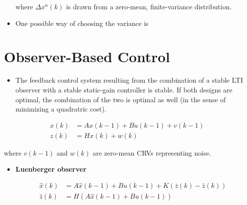 \documentclass[10pt,a4paper]{scrartcl}
\begin{document}
\begin{multicols*}{2}
\begin{multicols*}{3}
\begin{itemize}

where $\Delta x^n(k)$ is drawn from a zero-mean, finite-variance distribution.
\item One possible way of choosing the variance is 


\end{itemize}

\section{Observer-Based Control}


\begin{itemize}
\item The feedback control system resulting from the combination of a stable LTI observer with a stable static-gain controller is stable. If both designs are optimal, the combination of the two is optimal as well (in the sense of minimizing a quadratric cost).
\end{itemize}

\begin{align*}
x(k)&=Ax(k-1)+Bu(k-1)+v(k-1)\\
z(k)&=Hx(k)+w(k)
\end{align*}

where $v(k-1)$ and $w(k)$ are zero-mean CRVs representing noise.

\begin{itemize}
\item \textbf{Luenberger observer}

\begin{align*}
\hat{x}(k)&=A\hat{x}(k-1)+Bu(k-1)+K(\bar{z}(k)-\hat{z}(k))\\
\hat{z}(k)&=H(A\hat{x}(k-1)+Bu(k-1))
\end{align*}


\end{itemize}
\end{multicols*}
\end{multicols*}
\end{document}
